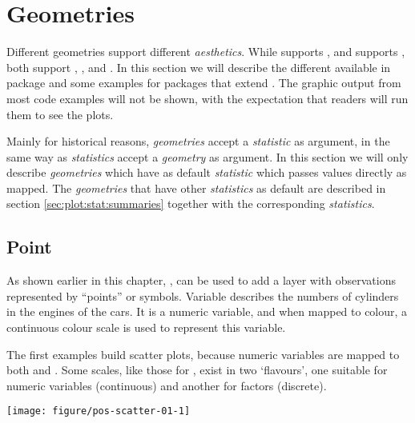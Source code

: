 \documentclass[krantz2]{krantz}\usepackage{knitr}%
\begin{document}
\section{Geometries}\label{sec:plot:geometries}

Different geometries support different \emph{aesthetics}. While  supports , and  supports , both support , ,  and . In this section we will describe the different  available in package \ggplot and some examples for packages that extend \ggplot. The graphic output from most code examples will not be shown, with the expectation that readers will run them to see the plots.

Mainly for historical reasons, \emph{geometries} accept a \emph{statistic} as argument, in the same way as \emph{statistics} accept a \emph{geometry} as argument. In this section we will only describe \emph{geometries} which have as default \emph{statistic}  which passes values directly as mapped. The \emph{geometries} that have other \emph{statistics} as default are described in section \ref{sec:plot:stat:summaries} together with the corresponding \emph{statistics}.

\subsection{Point}\label{sec:plot:geom:point}

As shown earlier in this chapter, , can be used to add a layer with observations represented by ``points'' or symbols. Variable  describes the numbers of cylinders in the engines of the cars. It is a numeric variable, and when mapped to colour, a continuous colour scale is used to represent this variable.

The first examples build scatter plots, because numeric variables are mapped to both  and .
Some scales, like those for , exist in two `flavours', one suitable for numeric variables (continuous) and another for factors (discrete).

\begin{knitrout}\footnotesize
{}\color{fgcolor}\begin{kframe}
\begin{alltt}
\hlstd{(} 
       \hlstd{(}      \hlopt{+}
  \hlstd{()}
\end{alltt}
\end{kframe}

{\centering \texttt{[image: figure/pos-scatter-01-1]} 

}



\end{knitrout}
\end{document}
